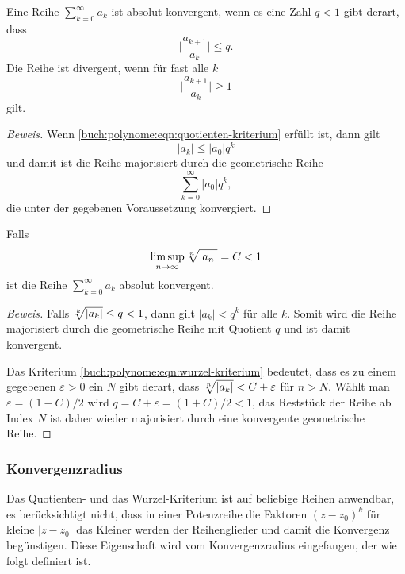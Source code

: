 \begin{satz}[Quotientenkriterium]
\label{buch:polynome:satz:quotientenkriterium}
%
Eine Reihe 
\(
\sum_{k=0}^\infty  a_k
\)
ist absolut konvergent, wenn es eine Zahl $q<1$ gibt derart, dass
\begin{equation}
\biggl|\frac{a_{k+1}}{a_k}\biggr|\le q.
\label{buch:polynome:eqn:quotienten-kriterium}
\end{equation}
Die Reihe ist divergent, wenn für fast alle $k$
\[
\biggl|\frac{a_{k+1}}{a_k}\biggr| \ge 1
\]
gilt.
\end{satz}

\begin{proof}[Beweis]
Wenn \eqref{buch:polynome:eqn:quotienten-kriterium} erfüllt ist, dann
gilt
\[
|a_k| \le |a_0| q^k
\]
und damit ist die Reihe majorisiert durch die geometrische Reihe 
\[
\sum_{k=0}^\infty
|a_0|q^k,
\]
die unter der gegebenen Voraussetzung konvergiert.
\end{proof}

\begin{satz}[Wurzelkriterium]
\label{buch:polynome:satz:wurzelkriterium}
Falls
\begin{equation}
\limsup_{n\to\infty} \root{n}\of{|a_n|} = C < 1
\label{buch:polynome:eqn:wurzel-kriterium}
\end{equation}
ist die Reihe
\(
\sum_{k=0}^\infty a_k
\)
absolut konvergent.
\end{satz}

\begin{proof}[Beweis]
Falls $\root{k}\of{|a_k|}\le q<1$, dann gilt
$|a_k|<q^k$ für alle $k$.
Somit wird die Reihe majorisiert durch die geometrische Reihe
mit Quotient $q$ und ist damit konvergent.

Das Kriterium \eqref{buch:polynome:eqn:wurzel-kriterium} bedeutet,
dass es zu einem gegebenen $\varepsilon > 0$ ein $N$ gibt derart,
dass $\root{n}\of{|a_k|} < C+\varepsilon$ für $n>N$.  
Wählt man $\varepsilon = (1-C)/2$ wird $q=C+\varepsilon=(1+C)/2<1$,
das Reststück der Reihe ab Index $N$ ist daher wieder majorisiert
durch eine konvergente geometrische Reihe.
\end{proof}

\subsubsection{Konvergenzradius}
Das Quotienten- und das Wurzel-Kriterium ist auf beliebige Reihen
anwendbar, es berücksichtigt nicht, dass in einer Potenzreihe
die Faktoren $(z-z_0)^k$ für kleine $|z-z_0|$ das Kleiner werden
der Reihenglieder und damit die Konvergenz begünstigen.
Diese Eigenschaft wird vom Konvergenzradius eingefangen, der wie
folgt definiert ist.

